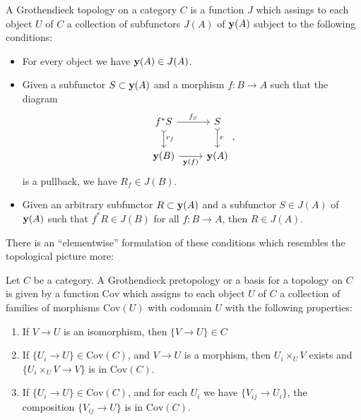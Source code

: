 \begin{definition}
	A Grothendieck topology on a category $C$ is a function $J$ which assings to each object $U$ of $C$ a collection of subfunctors $J(A)$ of $\mathbf{y}(A)$ subject to the following conditions:
	\begin{itemize}
		\item For every object we have $\mathbf{y}(A) \in J(A)$.
		\item
		      Given a subfunctor $S \subset \mathbf{y}(A)$ and a morphism $f \colon B \to A$ such that the diagram
		      \[
			      \begin{tikzcd}
				      f^*S       & S \\
				      {\yo(B)} & {\yo(A)}
				      \arrow["f_S"    ,       from=1-1, to=1-2]
				      \arrow["r"      , tail, from=1-2, to=2-2]
				      \arrow["r_f"    , tail, from=1-1, to=2-1]
				      \arrow["\yo(f)"',       from=2-1, to=2-2]
			      \end{tikzcd},
		      \]
		      is a pullback, we have $R_f \in J(B)$.
		\item Given an arbitrary subfunctor $R \subset \mathbf{y}(A)$ and a subfunctor $S \in J(A)$ of $\mathbf{y}(A)$ such that $f^*R \in J(B)$ for all $f \colon B \to A$, then $R \in J(A)$.
	\end{itemize}

	There is an ``elementwise'' formulation of these conditions which resembles the topological picture more:

	\begin{definition}
		Let $C$ be a category. A Grothendieck pretopology or a basis for a topology on $C$ is given by a function $\text{Cov}$ which assigns to each object $U$ of $C$ a collection of families of morphisms $\text{Cov}(U)$ with codomain $U$ with the following properties:
		\begin{enumerate}
			\item If $V \to U$ is an isomorphism, then $\{V \to U\} \in C$
			\item If $\{U_i \to U\} \in \text{Cov}(C)$, and $V \to U$ is a morphism, then $U_i \times_U V$ exists and $\{U_i \times_U V \to V\}$ is in $\text{Cov}(C)$.
			\item If $\{U_i \to U\} \in \text{Cov}(C)$, and for each $U_i$ we have $\{V_{ij} \to U_i\}$, the composition $\{V_{ij} \to U\}$ is in $\text{Cov}(C)$.
		\end{enumerate}
	\end{definition}
\end{definition}


